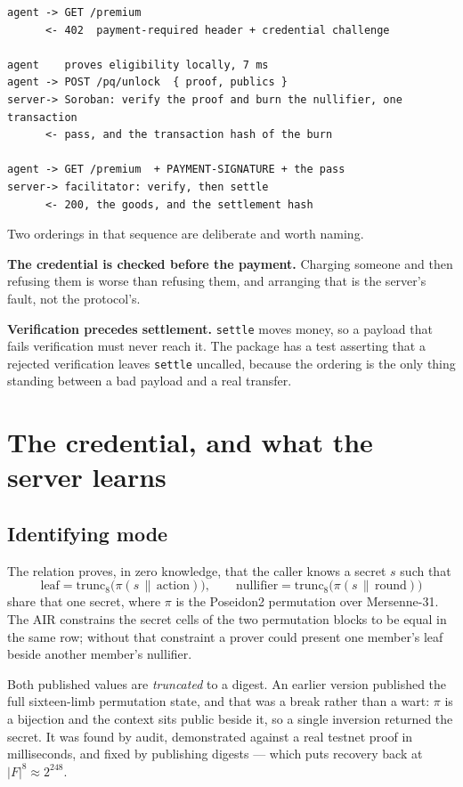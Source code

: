 \documentclass[11pt,a4paper]{article}
\begin{document}
\begin{lstlisting}
agent -> GET /premium
      <- 402  payment-required header + credential challenge

agent    proves eligibility locally, 7 ms
agent -> POST /pq/unlock  { proof, publics }
server-> Soroban: verify the proof and burn the nullifier, one transaction
      <- pass, and the transaction hash of the burn

agent -> GET /premium  + PAYMENT-SIGNATURE + the pass
server-> facilitator: verify, then settle
      <- 200, the goods, and the settlement hash
\end{lstlisting}

Two orderings in that sequence are deliberate and worth naming.

\textbf{The credential is checked before the payment.} Charging someone and then
refusing them is worse than refusing them, and arranging that is the server's
fault, not the protocol's.

\textbf{Verification precedes settlement.} \texttt{settle} moves money, so a
payload that fails verification must never reach it. The package has a test
asserting that a rejected verification leaves \texttt{settle} uncalled, because
the ordering is the only thing standing between a bad payload and a real
transfer.

\section{The credential, and what the server learns}

\subsection{Identifying mode}

The relation proves, in zero knowledge, that the caller knows a secret
$s$ such that
\[
  \mathrm{leaf} = \mathrm{trunc}_8\big(\pi(s \,\|\, \mathrm{action})\big),
  \qquad
  \mathrm{nullifier} = \mathrm{trunc}_8\big(\pi(s \,\|\, \mathrm{round})\big)
\]
share that one secret, where $\pi$ is the Poseidon2 permutation over
Mersenne-31. The AIR constrains the secret cells of the two permutation blocks
to be equal in the same row; without that constraint a prover could present one
member's leaf beside another member's nullifier.

Both published values are \emph{truncated} to a digest. An earlier version
published the full sixteen-limb permutation state, and that was a break rather
than a wart: $\pi$ is a bijection and the context sits public beside it, so a
single inversion returned the secret. It was found by audit, demonstrated
against a real testnet proof in milliseconds, and fixed by publishing digests
--- which puts recovery back at $|F|^8 \approx 2^{248}$.
\end{document}

